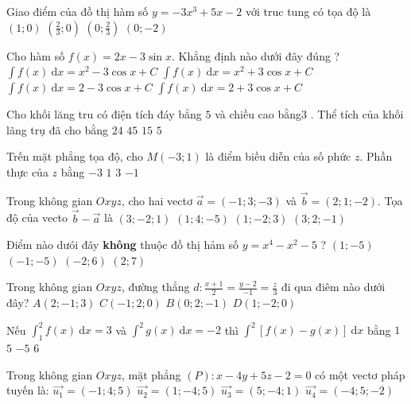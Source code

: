 \begin{ex} %
Giao điểm của đồ thị hàm số $y=-3 x^{3}+5 x-2$ với truc tung có tọa độ là
\choice
{$(1 ; 0)$}
{$\left(\frac{2}{3} ; 0\right)$}
{$\left(0 ; \frac{2}{3}\right)$}
{\True $(0 ;-2)$}
\end{ex}

\begin{ex} %
Cho hàm số $f(x)=2 x-3 \sin x$. Khẳng định nào dưới đây đúng ?
\choice
{$\int f(x) ~\mathrm{d} x=x^{2}-3 \cos x+ C $}
{\True $\int f(x) ~\mathrm{d} x=x^{2}+3 \cos x+ C $}
{$\int f(x) ~\mathrm{d} x=2-3 \cos x+ C $}
{$\int f(x) ~\mathrm{d} x=2+3 \cos x+ C $}
\end{ex}

\begin{ex} %
Cho khối lăng tru có điện tích đáy bẳng $5$ và chiều cao bằng$ 3$ . Thể tích của khối lãng trụ đã cho bằng
\choice
{$24$}
{$45$}
{\True $15$}
{$5$}
\end{ex}
\begin{ex} %
Trến mặt phẳng tọa độ, cho $M(-3 ; 1)$ là điểm biều diễn của số phức $z$. Phần thực của $z$ bằng
\choice
{\True$-3$}
{$1$}
{$3$}
{$-1$}
\end{ex}
\begin{ex} %
Trong không gian $O x y z$, cho hai vectơ $\vec{a}=(-1 ; 3 ;-3)$ và $\vec{b}=(2 ; 1 ;-2)$. Tọa độ của vecto $\vec{b}-\vec{a}$ là
\choice
{\True $(3 ;-2 ; 1)$}
{$(1 ; 4 ;-5)$}
{$(1 ;-2 ; 3)$}
{$(3 ; 2 ;-1)$}
\end{ex}
\begin{ex} %
Điểm nào dưói đây \textbf{không} thuộc đồ thị hảm số $y=x^{4}-x^{2}-5$ ?
\choice
{$(1;-5)$}
{$(-1;-5)$}
{\True$(-2;6)$}
{$(2;7)$}
\end{ex}
\begin{ex} %
Trong không gian $O x y z$,  đường thẳng $ d: \frac{x+1}{2}=\frac{y-2}{-1}=\frac{z}{3}$  đi qua điêm nào dưới đây?
\choice
{$A(2 ;-1 ; 3)$}
{\True $C(-1 ; 2 ; 0)$}
{$B(0 ; 2 ;-1)$}
{$D(1 ;-2 ; 0)$}
\end{ex}
\begin{ex} %
Nếu $\int_{1}^{2} f(x) ~\mathrm{d} x=3$ và $\int^{2} g(x) ~\mathrm{d} x=-2$ thì $\int^{2}[f(x)-g(x)] ~\mathrm{d} x$ bằng
\choice
{$1$}
{\True $5$}
{$-5$}
{$6$}
\end{ex}
\begin{ex} %
Trong không gian $Oxyz$, mặt phẳng $(P):x-4 y+5 z-2=0$ có một vectơ pháp tuyến là:
\choice
{$\overrightarrow{u_{1}}=(-1 ; 4 ; 5)$}
{\True $\overrightarrow{u_{2}}=(1 ;- 4 ; 5)$}
{$\overrightarrow{u_{3}}=(5 ; -4 ; 1)$}
{$\overrightarrow{u_{4}}=(-4 ; 5 ; -2)$}
\end{ex}
